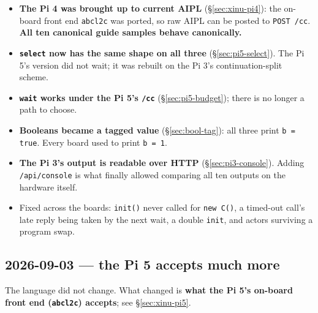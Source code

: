 \documentclass[11pt,a4paper]{article}
\begin{document}
\begin{itemize}
\item \textbf{The Pi 4 was brought up to current AIPL} (\S\ref{sec:xinu-pi4}):
  the on-board front end \texttt{abcl2c} was ported, so raw AIPL can be posted
  to \texttt{POST /cc}. \textbf{All ten canonical guide samples behave canonically.}
\item \textbf{\texttt{select} now has the same shape on all three}
  (\S\ref{sec:pi5-select}). The Pi 5's version did not wait; it was rebuilt on
  the Pi 3's continuation-split scheme.
\item \textbf{\texttt{wait} works under the Pi 5's \texttt{/cc}}
  (\S\ref{sec:pi5-budget}); there is no longer a path to choose.
\item \textbf{Booleans became a tagged value} (\S\ref{sec:bool-tag}): all three
  print \texttt{b = true}. Every board used to print \texttt{b = 1}.
\item \textbf{The Pi 3's output is readable over HTTP} (\S\ref{sec:pi3-console}).
  Adding \texttt{/api/console} is what finally allowed comparing all ten
  outputs on the hardware itself.
\item Fixed across the boards: \texttt{init()} never called for \texttt{new C()},
  a timed-out call's late reply being taken by the next wait, a double
  \texttt{init}, and actors surviving a program swap.
\end{itemize}

\subsection*{2026-09-03 --- the Pi 5 accepts much more}

The language did not change. What changed is \textbf{what the Pi 5's on-board
front end (\texttt{abcl2c}) accepts}; see \S\ref{sec:xinu-pi5}.
\end{document}
